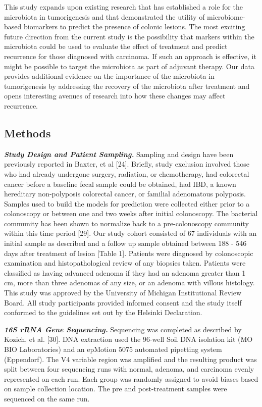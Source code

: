 \documentclass[12pt,]{article}
\begin{document}
This study expands upon existing research that has established a role
for the microbiota in tumorigenesis and that demonstrated the utility of
microbiome-based biomarkers to predict the presence of colonic lesions.
The most exciting future direction from the current study is the
possibility that markers within the microbiota could be used to evaluate
the effect of treatment and predict recurrence for those diagnosed with
carcinoma. If such an approach is effective, it might be possible to
target the microbiota as part of adjuvant therapy. Our data provides
additional evidence on the importance of the microbiota in tumorigenesis
by addressing the recovery of the microbiota after treatment and opens
interesting avenues of research into how these changes may affect
recurrence.

\newpage

\subsection{Methods}\label{methods}

\textbf{\emph{Study Design and Patient Sampling.}} Sampling and design
have been previously reported in Baxter, et al {[}24{]}. Briefly, study
exclusion involved those who had already undergone surgery, radiation,
or chemotherapy, had colorectal cancer before a baseline fecal sample
could be obtained, had IBD, a known hereditary non-polyposis colorectal
cancer, or familial adenomatous polyposis. Samples used to build the
models for prediction were collected either prior to a colonoscopy or
between one and two weeks after initial colonoscopy. The bacterial
community has been shown to normalize back to a pre-colonoscopy
community within this time period {[}29{]}. Our study cohort consisted
of 67 individuals with an initial sample as described and a follow up
sample obtained between 188 - 546 days after treatment of lesion
{[}Table 1{]}. Patients were diagnosed by colonoscopic examination and
histopathological review of any biopsies taken. Patients were classified
as having advanced adenoma if they had an adenoma greater than 1 cm,
more than three adenomas of any size, or an adenoma with villous
histology. This study was approved by the University of Michigan
Institutional Review Board. All study participants provided informed
consent and the study itself conformed to the guidelines set out by the
Helsinki Declaration.

\textbf{\emph{16S rRNA Gene Sequencing.}} Sequencing was completed as
described by Kozich, et al. {[}30{]}. DNA extraction used the 96-well
Soil DNA isolation kit (MO BIO Laboratories) and an epMotion 5075
automated pipetting system (Eppendorf). The V4 variable region was
amplified and the resulting product was split between four sequencing
runs with normal, adenoma, and carcinoma evenly represented on each run.
Each group was randomly assigned to avoid biases based on sample
collection location. The pre and post-treatment samples were sequenced
on the same run.
\end{document}
